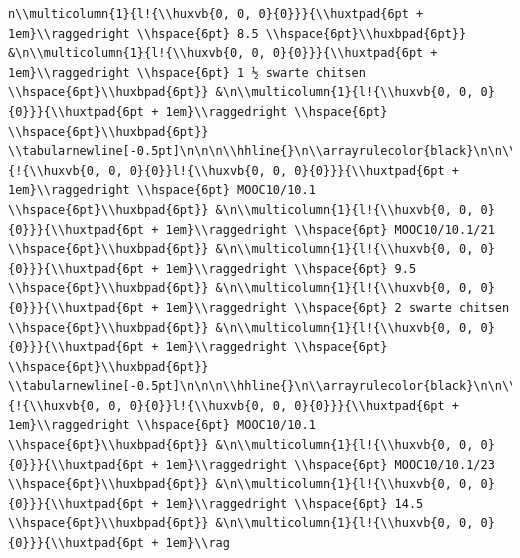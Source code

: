 \documentclass[11pt,preprint, authoryear]{elsarticle}
\numberwithin{equation}{section}
\numberwithin{figure}{section}
\numberwithin{table}{section}
\begin{document}
\begin{verbatim}
n\\multicolumn{1}{l!{\\huxvb{0, 0, 0}{0}}}{\\huxtpad{6pt + 1em}\\raggedright \\hspace{6pt} 8.5 \\hspace{6pt}\\huxbpad{6pt}} &\n\\multicolumn{1}{l!{\\huxvb{0, 0, 0}{0}}}{\\huxtpad{6pt + 1em}\\raggedright \\hspace{6pt} 1 ½ swarte chitsen \\hspace{6pt}\\huxbpad{6pt}} &\n\\multicolumn{1}{l!{\\huxvb{0, 0, 0}{0}}}{\\huxtpad{6pt + 1em}\\raggedright \\hspace{6pt}  \\hspace{6pt}\\huxbpad{6pt}} \\tabularnewline[-0.5pt]\n\n\n\\hhline{}\n\\arrayrulecolor{black}\n\n\\multicolumn{1}{!{\\huxvb{0, 0, 0}{0}}l!{\\huxvb{0, 0, 0}{0}}}{\\huxtpad{6pt + 1em}\\raggedright \\hspace{6pt} MOOC10/10.1 \\hspace{6pt}\\huxbpad{6pt}} &\n\\multicolumn{1}{l!{\\huxvb{0, 0, 0}{0}}}{\\huxtpad{6pt + 1em}\\raggedright \\hspace{6pt} MOOC10/10.1/21 \\hspace{6pt}\\huxbpad{6pt}} &\n\\multicolumn{1}{l!{\\huxvb{0, 0, 0}{0}}}{\\huxtpad{6pt + 1em}\\raggedright \\hspace{6pt} 9.5 \\hspace{6pt}\\huxbpad{6pt}} &\n\\multicolumn{1}{l!{\\huxvb{0, 0, 0}{0}}}{\\huxtpad{6pt + 1em}\\raggedright \\hspace{6pt} 2 swarte chitsen \\hspace{6pt}\\huxbpad{6pt}} &\n\\multicolumn{1}{l!{\\huxvb{0, 0, 0}{0}}}{\\huxtpad{6pt + 1em}\\raggedright \\hspace{6pt}  \\hspace{6pt}\\huxbpad{6pt}} \\tabularnewline[-0.5pt]\n\n\n\\hhline{}\n\\arrayrulecolor{black}\n\n\\multicolumn{1}{!{\\huxvb{0, 0, 0}{0}}l!{\\huxvb{0, 0, 0}{0}}}{\\huxtpad{6pt + 1em}\\raggedright \\hspace{6pt} MOOC10/10.1 \\hspace{6pt}\\huxbpad{6pt}} &\n\\multicolumn{1}{l!{\\huxvb{0, 0, 0}{0}}}{\\huxtpad{6pt + 1em}\\raggedright \\hspace{6pt} MOOC10/10.1/23 \\hspace{6pt}\\huxbpad{6pt}} &\n\\multicolumn{1}{l!{\\huxvb{0, 0, 0}{0}}}{\\huxtpad{6pt + 1em}\\raggedright \\hspace{6pt} 14.5 \\hspace{6pt}\\huxbpad{6pt}} &\n\\multicolumn{1}{l!{\\huxvb{0, 0, 0}{0}}}{\\huxtpad{6pt + 1em}\\rag
\end{verbatim}
\end{document}
